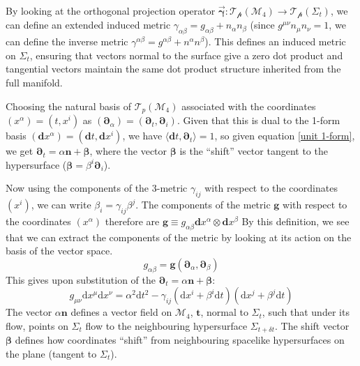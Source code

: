 \documentclass[aps,prd,reprint,preprintnumbers,showpacs,floatfix,nofootinbib,superscript address]{revtex4-2}
\begin{document}
By looking at the orthogonal projection operator $\Vec{\mathbf{\gamma}} : \mathcal{T_p}(\mathcal{M}_4) \rightarrow \mathcal{T_p}(\Sigma_t)$, we can define an extended induced metric $\gamma_{\alpha\beta} = g_{\alpha\beta} + n_\alpha n_\beta$ (since $g^{\mu\nu} n_\mu n_\nu = 1$, we can define the inverse metric $\gamma^{\alpha\beta} = g^{\alpha\beta} + n^\alpha n^\beta$). This defines an induced metric on $\Sigma_t$, ensuring that vectors normal to the surface give a zero dot product and tangential vectors maintain the same dot product structure inherited from the full manifold. 

Choosing the natural basis of $\mathcal{T}_p(\mathcal{M}_4)$ associated with the coordinates $(x^\alpha) =(t,x^i)$ as $(\bm{\partial}_\alpha)=(\bm{\partial}_t, \bm{\partial}_i)$. Given that this is dual to the 1-form basis $(\textbf{d}x^\alpha) = (\textbf{d}t, \textbf{d}x^i)$, we have $\langle \textbf{d}t, \bm{\partial}_t \rangle = 1$, so given equation \ref{unit 1-form}, we get $\bm{\partial}_t = \alpha \bm{n} + \bm{\beta}$, where the vector $\bm{\beta}$ is the ``shift'' vector tangent to the hypersurface ($\bm{\beta} = \beta^i \boldsymbol{\partial}_i$). 

Now using the components of the 3-metric $\gamma_{i j}$ with respect to the coordinates $(x^i)$, we can write $\beta_i = \gamma_{ij}\beta^j$. The components of the metric $\bm{g}$ with respect to the coordinates $(x^\alpha)$ therefore are $\bm{g} \equiv g_{\alpha \beta} \textbf{d}x^\alpha \otimes \textbf{d}x^\beta$
By this definition, we see that we can extract the components of the metric by looking at its action on the basis of the vector space. 
\begin{equation}
    g_{\alpha\beta} = \bm{g} (\bm{\partial}_\alpha, \bm{\partial}_\beta)
\end{equation}
This gives upon substitution of the $\bm{\partial}_t = \alpha \bm{n} + \bm{\beta}$:
\begin{equation} \label{General split Metric}
    g_{\mu \nu} \text{d}x^\mu\text{d}x^\nu = \alpha^2 \text{d}t^2 - \gamma_{ij}(\text{d}x^i + \beta^i \text{d}t)(\text{d}x^j + \beta^j \text{d}t)
\end{equation}
The vector $\alpha \bm{n}$ defines a vector field on $\mathcal{M}_4$, $\bm{t}$, normal to $\Sigma_t$, such that under its flow, points on $\Sigma_t$ flow to the neighbouring hypersurface $\Sigma_{t+\delta t}$. The shift vector $\bm{\beta}$ defines how coordinates ``shift'' from neighbouring spacelike hypersurfaces on the plane (tangent to $\Sigma_t$). 
\end{document}
